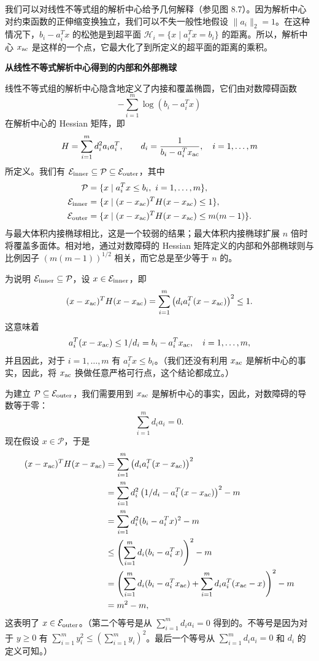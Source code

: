 \documentclass[UTF8, 12pt, fontset=fandol, oneside]{ctexart}
\begin{document}
我们可以对线性不等式组的解析中心给予几何解释（参见图 8.7）。因为解析中心对约束函数的正伸缩变换独立，我们可以不失一般性地假设 $\|a_i\|_2=1$。在这种情况下，$b_i-a_i^Tx$ 的松弛是到超平面 $\mathcal{H}_i=\{x\mid a_i^Tx=b_i\}$ 的距离。所以，解析中心 $x_{\rm ac}$ 是这样的一个点，它最大化了到所定义的超平面的距离的乘积。

\noindent\textbf{从线性不等式解析中心得到的内部和外部椭球}

线性不等式组的解析中心隐含地定义了内接和覆盖椭圆，它们由对数障碍函数
\[
-\sum_{i=1}^m \log(b_i-a_i^Tx)
\]
在解析中心的 Hessian 矩阵，即
\[
H=\sum_{i=1}^m d_i^2 a_i a_i^T,\qquad d_i=\frac{1}{b_i-a_i^Tx_{\rm ac}},\quad i=1,\ldots,m
\]
所定义。我们有 $\mathcal{E}_{\rm inner}\subseteq\mathcal{P}\subseteq\mathcal{E}_{\rm outer}$，其中
\[
\begin{split}
\mathcal{P}&=\{x\mid a_i^Tx\leq b_i,\ i=1,\ldots,m\},\\
\mathcal{E}_{\rm inner}&=\{x\mid (x-x_{\rm ac})^TH(x-x_{\rm ac})\leq 1\},\\
\mathcal{E}_{\rm outer}&=\{x\mid (x-x_{\rm ac})^TH(x-x_{\rm ac})\leq m(m-1)\}.
\end{split}
\]
与最大体积内接椭球相比，这是一个较弱的结果；最大体积内接椭球扩展 $n$ 倍时将覆盖多面体。相对地，通过对数障碍的 Hessian 矩阵定义的内部和外部椭球则与比例因子 $(m(m-1))^{1/2}$ 相关，而它总是至少等于 $n$ 的。

为说明 $\mathcal{E}_{\rm inner}\subseteq\mathcal{P}$，设 $x\in\mathcal{E}_{\rm inner}$，即
\[
(x-x_{\rm ac})^TH(x-x_{\rm ac})
=\sum_{i=1}^m\left(d_ia_i^T(x-x_{\rm ac})\right)^2\leq 1.
\]
这意味着
\[
a_i^T(x-x_{\rm ac})\leq 1/d_i=b_i-a_i^Tx_{\rm ac},\quad i=1,\ldots,m,
\]
并且因此，对于 $i=1,\ldots,m$ 有 $a_i^Tx\leq b_i$。（我们还没有利用 $x_{\rm ac}$ 是解析中心的事实，因此，将 $x_{\rm ac}$ 换做任意严格可行点，这个结论都成立。）

为建立 $\mathcal{P}\subseteq\mathcal{E}_{\rm outer}$，我们需要用到 $x_{\rm ac}$ 是解析中心的事实，因此，对数障碍的导数等于零：
\[
\sum_{i=1}^m d_i a_i=0.
\]
现在假设 $x\in\mathcal{P}$，于是
\[
\begin{split}
(x-x_{\rm ac})^TH(x-x_{\rm ac})
&=\sum_{i=1}^m\left(d_i a_i^T(x-x_{\rm ac})\right)^2\\
&=\sum_{i=1}^m d_i^2\left(1/d_i-a_i^T(x-x_{\rm ac})\right)^2-m\\
&=\sum_{i=1}^m d_i^2(b_i-a_i^Tx)^2-m\\
&\leq \left(\sum_{i=1}^m d_i(b_i-a_i^Tx)\right)^2-m\\
&=\left(\sum_{i=1}^m d_i(b_i-a_i^Tx_{\rm ac})+\sum_{i=1}^m d_i a_i^T(x_{\rm ac}-x)\right)^2-m\\
&=m^2-m,
\end{split}
\]
这表明了 $x\in\mathcal{E}_{\rm outer}$。（第二个等号是从 $\sum_{i=1}^m d_i a_i=0$ 得到的。不等号是因为对于 $y\geq 0$ 有 $\sum_{i=1}^m y_i^2\leq (\sum_{i=1}^m y_i)^2$。最后一个等号从 $\sum_{i=1}^m d_i a_i=0$ 和 $d_i$ 的定义可知。）
\end{document}
